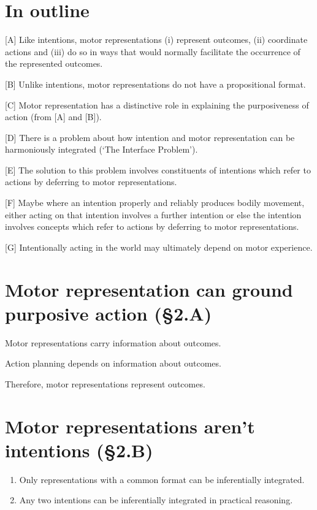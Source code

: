 \documentclass[11pt]{extarticle}
\begin{document}
\begin{multicols}{3}
\section{In outline}
[A] Like intentions, motor representations (i) represent outcomes, (ii) coordinate actions and (iii) do so in ways that would normally facilitate the occurrence of the represented outcomes.

[B] Unlike intentions, motor representations do not have a propositional format. 

[C] Motor representation has a distinctive role in explaining the purposiveness of action (from [A] and [B]).

[D] There is a problem about how intention and motor representation can be harmoniously integrated (`The Interface Problem').

[E] The solution to this problem involves constituents of intentions which refer to actions by deferring to motor representations.

[F] Maybe where an intention properly and reliably produces bodily movement, either acting on that intention involves a further intention or else the intention involves concepts which refer to actions by deferring to motor representations.

[G] Intentionally acting in the world may ultimately depend on motor experience.



\section{Motor representation can ground purposive action (§2.A)}

Motor representations carry information about outcomes.

Action planning depends on information about outcomes.

Therefore, motor representations represent outcomes.


\section{Motor representations aren't intentions (§2.B)}
\begin{enumerate}
\item Only representations with a common format can be inferentially integrated.

\item Any two intentions can be inferentially integrated in practical reasoning.


\end{enumerate}
\end{multicols}
\end{document}

